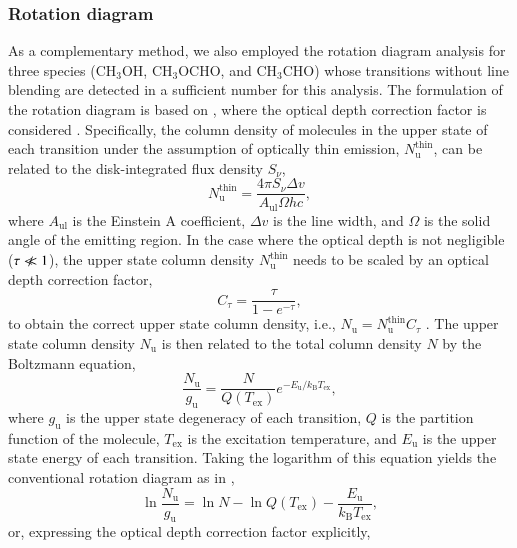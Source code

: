 \documentclass[linenumbers, twocolumn, twocolappendix, astrosymb, times]{aastex631}
\newcommand{\methanol}{CH$_3$OH\xspace}
\newcommand{\acetaldehyde}{CH$_3$CHO\xspace}
\newcommand{\methylformate}{CH$_3$OCHO\xspace}
\begin{document}
\subsubsection{Rotation diagram}
As a complementary method, we also employed the rotation diagram analysis \citep[e.g.,][]{Goldsmith1999} for three species (\methanol, \methylformate, and \acetaldehyde) whose transitions without line blending are detected in a sufficient number for this analysis. The formulation of the rotation diagram is based on \citet{Goldsmith1999}, where the optical depth correction factor is considered \citep[see also, e.g., ][]{Loomis2018}. Specifically, the column density of molecules in the upper state of each transition under the assumption of optically thin emission, $N_\mathrm{u}^{\mathrm{thin}}$, can be related to the disk-integrated flux density $S_\nu$,
\begin{equation}
    N_\mathrm{u}^\mathrm{thin} = \frac{4\pi S_\nu \Delta v}{A_\mathrm{ul}\Omega hc},
\end{equation}
where $A_\mathrm{ul}$ is the Einstein A coefficient, $\Delta v$ is the line width, and $\Omega$ is the solid angle of the emitting region. In the case where the optical depth is not negligible ($\tau \nll 1$), the upper state column density $N_\mathrm{u}^\mathrm{thin}$ needs to be scaled by an optical depth correction factor,
\begin{equation}
    C_\tau = \frac{\tau}{1 - e^{-\tau}},
\end{equation}
to obtain the correct upper state column density, i.e., $N_\mathrm{u} = N_\mathrm{u}^\mathrm{thin} C_\tau$ \citep{Goldsmith1999}. The upper state column density $N_\mathrm{u}$ is then related to the total column density $N$ by the Boltzmann equation,
\begin{equation}
    \frac{N_\mathrm{u}}{g_\mathrm{u}} = \frac{N}{Q(T_\mathrm{ex})}e^{-E_\mathrm{u} / k_\mathrm{B} T_\mathrm{ex}},
\end{equation}
where $g_\mathrm{u}$ is the upper state degeneracy of each transition, $Q$ is the partition function of the molecule, $T_\mathrm{ex}$ is the excitation temperature, and $E_\mathrm{u}$ is the upper state energy of each transition. Taking the logarithm of this equation yields the conventional rotation diagram as in \citet{Goldsmith1999},
\begin{equation}
    \ln\frac{N_\mathrm{u}}{g_\mathrm{u}} = \ln N - \ln Q(T_\mathrm{ex}) - \frac{E_\mathrm{u}}{k_\mathrm{B}T_\mathrm{ex}},
\end{equation}
or, expressing the optical depth correction factor explicitly,
\end{document}
